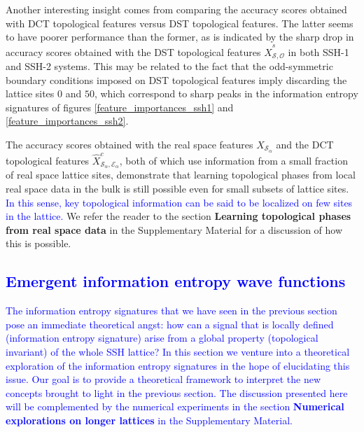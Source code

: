 \documentclass[10pt]{revtex4-1}
\newcommand\SSHSys{SSH systems}
\newcommand\Feat{Features}
\newcommand\ValEig{Val. eigenvectors}
\newcommand\TestEig{Test eigenvectors}
\newcommand\ValHam{Val. Hamiltonians}
\newcommand\TestHam{Test Hamiltonians}
\begin{document}
Another interesting insight comes from comparing the accuracy scores obtained with DCT topological features versus DST topological features. The latter seems to have poorer performance than the former, as is indicated by the sharp drop in accuracy scores obtained with the DST topological features $\hat{X}^s_{\mathcal{S},\mathcal{O}}$ in both SSH-1 and SSH-2 systems. This may be related to the fact that the odd-symmetric boundary conditions imposed on DST topological features imply discarding the lattice sites 0 and $50$, which correspond to sharp peaks in the information entropy signatures of figures \ref{feature_importances_ssh1} and \ref{feature_importances_ssh2}.  

The accuracy scores obtained with the real space features $X_{\mathcal{S}_\alpha}$ and the DCT topological features $\hat{X}^c_{\mathcal{S}_\alpha,\mathcal{E}_\alpha}$, both of which use information from a small fraction of real space lattice sites, demonstrate that learning topological phases from local real space data in the bulk is still possible even for small subsets of lattice sites. \textcolor{blue}{In this sense, key topological information can be said to be localized on few sites in the lattice.} We refer the reader to the section \textbf{Learning topological phases from real space data} in the Supplementary Material for a discussion of how this is possible.       







\textcolor{blue}{
\section{Emergent information entropy wave functions}
\label{emergent_information_entropy_wave_functions}
}
\textcolor{blue}{
The information entropy signatures that we have seen in the previous section pose an immediate theoretical angst: how can a signal that is locally defined (information entropy signature) arise from a global property (topological invariant) of the whole SSH lattice?    
In this section we venture into a theoretical exploration of the information entropy signatures in the hope of elucidating this issue. Our goal is to provide a theoretical framework to interpret the new concepts brought to light in the previous section.  The discussion presented here will be complemented by the numerical experiments in the section \textbf{Numerical explorations on longer lattices} in the Supplementary Material.} 
\end{document}
